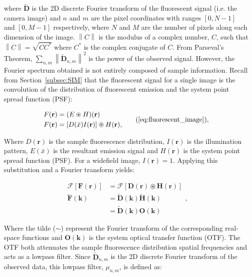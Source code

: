 where $\tilde{\textbf{D}}$ is the 2D discrete Fourier transform of 
the fluorescent signal (i.e. the camera image) and $n$ and 
$m$ are the pixel coordinates with ranges $[0, N-1]$ and $[0, M-1]$ 
respectively, where $N$ and $M$ are the number of pixels along each 
dimension of the image. $\left\| C \right\|$ is the modulus of a complex 
number, $C$, such that $\left\| C \right\| = \sqrt{CC^{*}}$ where $C^{*}$ is 
the complex conjugate of $C$. From Parseval's Theorem, $\sum\limits_{n,m}
\left\| \tilde{\textbf{D}}_{n,m} \right\|^2$ is the power of the 
observed signal. However, the Fourier spectrum obtained is not 
entirely composed of sample information. Recall from Section~\ref{subsec:SIM} 
that the fluorescent signal for a single image is the convolution of the 
distribution of fluorescent emission and the system point spread function 
(PSF):

\begin{equation}
\begin{split}
F(\textbf{r}) &= (E \circledast H)(\textbf{r})\\
F(\textbf{r}) &= [D(\bar{x})I(\textbf{r})] \circledast H(\textbf{r}),\\
\end{split}\tag{\ref{eq:fluorescent_image}},
\end{equation}

Where $D(\textbf{r})$ is the sample fluorescence distribution, 
$I(\textbf{r})$ is the illumination pattern, $E(\bar{x})$ is
the resultant emission signal and $H(\textbf{r})$ is the system 
point spread function (PSF). For a widefield image, 
$I(\textbf{r}) = 1$. Applying this substitution and a Fourier 
transform yields:

\begin{equation}\label{eq:fluor_signal_fourier}
\begin{split}
\mathcal{F}[\textbf{F}(\textbf{r})] &= \mathcal{F}[\textbf{D}(\textbf{r}) \circledast \textbf{H}(\textbf{r})]\\
\tilde{\textbf{F}}(\textbf{k}) &= \tilde{\textbf{D}}(\textbf{k}) \tilde{\textbf{H}}(\textbf{k})\\
&= \tilde{\textbf{D}}(\textbf{k}) \textbf{O}(\textbf{k})		
\end{split},
\end{equation}

Where the tilde ($\sim$) represent the Fourier transform of the corresponding 
real-space functions and $\textbf{O}(\textbf{k})$ is the system optical transfer 
function (OTF)\cite{gustafsson2008three}. The OTF both attenuates the sample 
fluorescence distribution spatial frequencies and acts as a lowpass filter. 
Since $\tilde{\textbf{D}}_{n,m}$ is the 2D discrete Fourier transform of 
the observed data, this lowpass filter, $\mu_{n,m}$, is defined as:

